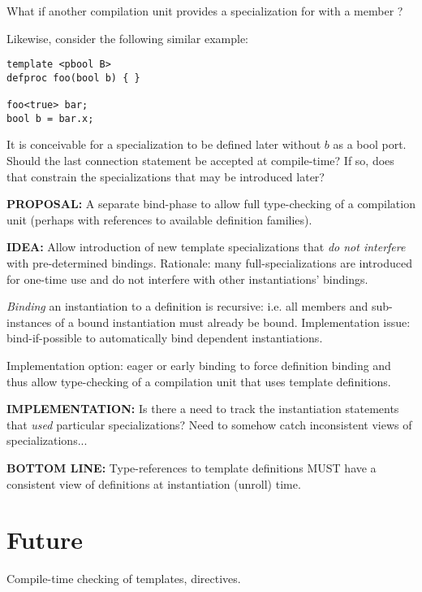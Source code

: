 What if another compilation unit provides a specialization for 
 with a  member ?

Likewise, consider the following similar example:

\begin{verbatim}
template <pbool B>
defproc foo(bool b) { }

foo<true> bar;
bool b = bar.x;
\end{verbatim}

It is conceivable for a specialization to be defined later without
$b$ as a bool port.  
Should the last connection statement be accepted at compile-time?
If so, does that constrain the specializations that may be introduced later?


\textbf{PROPOSAL:}
A separate bind-phase to allow full type-checking of a compilation unit
(perhaps with references to available definition families).  

\textbf{IDEA:}
Allow introduction of new template specializations that
\emph{do not interfere} with pre-determined bindings.  
Rationale: many full-specializations are introduced for one-time use and
do not interfere with other instantiations' bindings.  

\emph{Binding} an instantiation to a definition is recursive: i.e.
all members and sub-instances of a bound instantiation must already be bound.  
Implementation issue: bind-if-possible to automatically bind dependent
instantiations.  

Implementation option: eager or early binding to force 
definition binding and thus allow type-checking of a 
compilation unit that uses template definitions.  

\textbf{IMPLEMENTATION:}
Is there a need to track the instantiation statements that \emph{used}
particular specializations?  Need to somehow catch inconsistent views
of specializations...

\textbf{BOTTOM LINE:}
Type-references to template definitions MUST have a consistent
view of definitions at instantiation (unroll) time.  

\section{Future}
\label{sec:templates:future}

Compile-time checking of templates, directives.  

